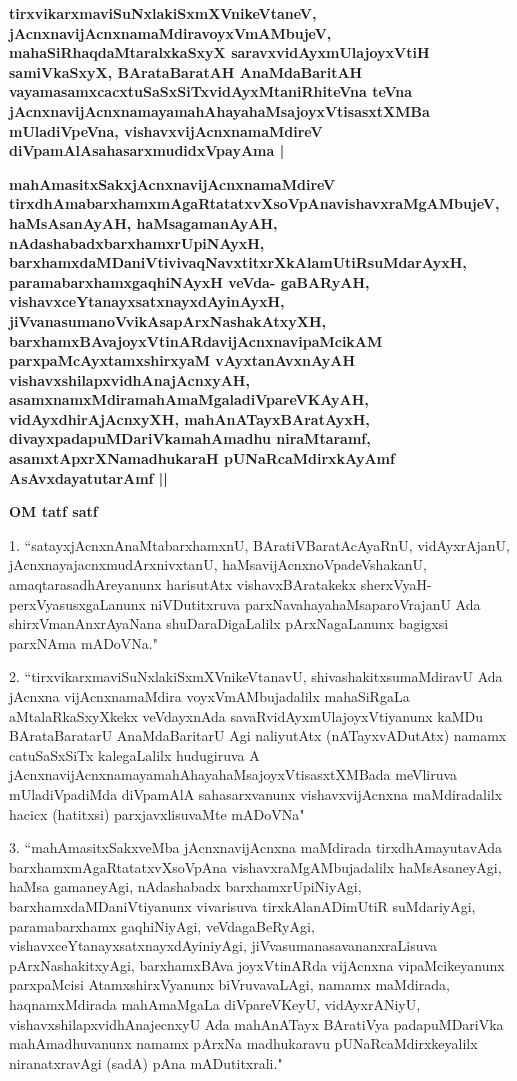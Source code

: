\medskip
\textbf{tirxvikarxmaviSuNxlakiSxmXVnikeVtaneV, jAcnxnavijAcnxnamaMdiravoyxVmAMbujeV, mahaSiRhaqdaMtaralxkaSxyX saravxvidAyxmUlajoyxVtiH samiVkaSxyX, BArataBaratAH AnaMdaBaritAH vayamasamxcacxtuSaSxSiTxvidAyxMtaniRhiteVna teVna jAcnxnavijAcnxnamayamahAhayahaMsajoyxVtisasxtXMBa mUladiVpeVna, vishavxvijAcnxnamaMdireV diVpamAlAsahasarxmudidxVpayAma |}

\medskip
\textbf{
mahAmasitxSakxjAcnxnavijAcnxnamaMdireV tirxdhAmabarxhamxmAgaRtatatxvXsoVpAnavishavxraMgAMbujeV, haMsAsanAyAH, haMsagamanAyAH, nAdashabadxbarxhamxrUpiNAyxH, barxhamxdaMDaniVtivivaqNavxtitxrXkAlamUtiRsuMdarAyxH, paramabarxhamxgaqhiNAyxH veVda- gaBARyAH, vishavxceYtanayxsatxnayxdAyinAyxH, jiVvanasumanoVvikAsapArxNashakAtxyXH, barxhamxBAvajoyxVtinARdavijAcnxnavipaMcikAM parxpaMcAyxtamxshirxyaM vAyxtanAvxnAyAH vishavxshilapxvidhAnajAcnxyAH, asamxnamxMdiramahAmaMgaladiVpareVKAyAH, vidAyxdhirAjAcnxyXH, mahAnATayxBAratAyxH, divayxpadapuMDariVkamahAmadhu niraMtaramf, asamxtApxrXNamadhukaraH pUNaRcaMdirxkAyAmf AsAvxdayatutarAmf ||}

\begin{center}
{\bfseries{OM tatf satf}}
\end{center}

\newpage

\begin{artha}
1. ``satayxjAcnxnAnaMtabarxhamxnU, BAratiVBaratAcAyaRnU, vidAyxrAjanU, jAcnxnayajacnxmudArxnivxtanU, haMsavijAcnxnoVpadeVshakanU, amaqtarasadhAreyanunx harisutAtx vishavxBAratakekx sherxVyaH-perxVyasusxgaLanunx niVDutitxruva parxNavahayahaMsaparoVrajanU Ada shirxVmanAnxrAyaNana shuDaraDigaLalilx pArxNagaLanunx bagigxsi parxNAma mADoVNa."
\end{artha}

\begin{artha}
2. ``tirxvikarxmaviSuNxlakiSxmXVnikeVtanavU, shivashakitxsumaMdiravU Ada jAcnxna vijAcnxnamaMdira voyxVmAMbujadalilx mahaSiRgaLa aMtalaRkaSxyXkekx veVdayxnAda savaRvidAyxmUlajoyxVtiyanunx kaMDu BArataBaratarU AnaMdaBaritarU Agi naliyutAtx (nATayxvADutAtx) namamx catuSaSxSiTx kalegaLalilx hudugiruva A jAcnxnavijAcnxnamayamahAhayahaMsajoyxVtisasxtXMBada meVliruva mUladiVpadiMda diVpamAlA sahasarxvanunx vishavxvijAcnxna maMdiradalilx hacicx (hatitxsi) parxjavxlisuvaMte mADoVNa"
\end{artha}

\begin{artha}
3. ``mahAmasitxSakxveMba jAcnxnavijAcnxna maMdirada tirxdhAmayutavAda barxhamxmAgaRtatatxvXsoVpAna vishavxraMgAMbujadalilx haMsAsaneyAgi, haMsa gamaneyAgi, nAdashabadx barxhamxrUpiNiyAgi, barxhamxdaMDaniVtiyanunx vivarisuva tirxkAlanADimUtiR suMdariyAgi, paramabarxhamx gaqhiNiyAgi, veVdagaBeRyAgi, vishavxceYtanayxsatxnayxdAyiniyAgi, jiVvasumanasavananxraLisuva pArxNashakitxyAgi, barxhamxBAva joyxVtinARda vijAcnxna vipaMcikeyanunx parxpaMcisi AtamxshirxVyanunx biVruvavaLAgi, namamx maMdirada, haqnamxMdirada mahAmaMgaLa diVpareVKeyU, vidAyxrANiyU, vishavxshilapxvidhAnajecnxyU Ada mahAnATayx BAratiVya padapuMDariVka mahAmadhuvanunx namamx pArxNa madhukaravu pUNaRcaMdirxkeyalilx niranatxravAgi (sadA) pAna mADutitxrali."
\end{artha}




